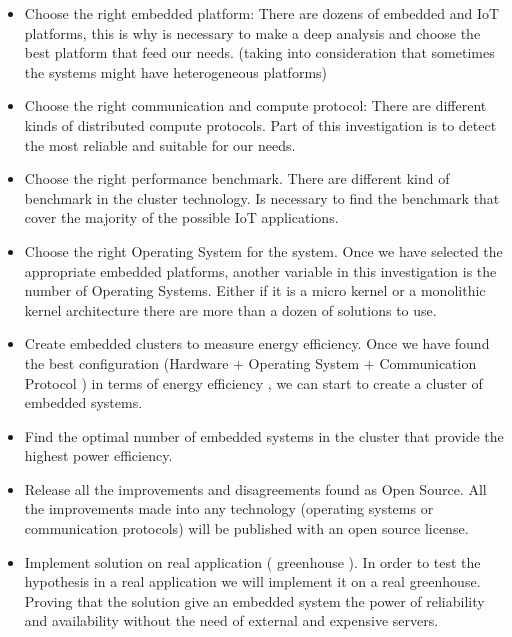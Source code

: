 \begin{itemize}

\item Choose the right embedded platform: There are dozens of embedded and IoT
platforms, this is why is necessary to make a deep analysis and choose the best
platform that feed our needs. (taking into consideration that sometimes the
systems might have heterogeneous platforms)

\item Choose the right communication and compute protocol: There are different
kinds of distributed compute protocols. Part of this investigation is to detect
the most reliable and suitable for our needs.

\item Choose the right performance benchmark. There are different kind of
benchmark in the cluster technology. Is necessary to find the benchmark that
cover the majority of the possible IoT applications.

\item Choose the right Operating System for the system. Once we have selected
the appropriate embedded platforms, another variable in this investigation is
the number of Operating Systems. Either if it is a micro kernel or a monolithic
kernel architecture there are more than a dozen of solutions to use.

\item Create embedded clusters to measure energy efficiency. Once we have found
the best configuration (Hardware + Operating System + Communication Protocol )
in terms of energy efficiency , we can start to create a cluster of embedded
systems.

\item Find the optimal number of embedded systems in the cluster that provide
the highest power efficiency. 

\item Release all the improvements and disagreements found as Open Source. All
the improvements made into any technology (operating systems or communication
protocols) will be published with an open source license.

\item Implement solution on real application ( greenhouse ). In order to test
the hypothesis in a real application we will implement it on a real greenhouse.
Proving that the solution give an embedded system the power of reliability and
availability without the need of external and expensive servers.  \end{itemize}

\clearpage
